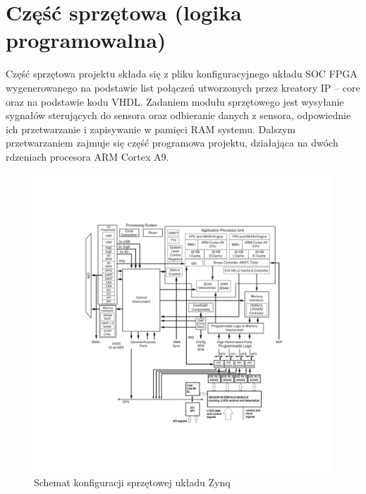\documentclass[a4paper,11pt,oneside]{book}  %
\begin{document}
\section{Część sprzętowa (logika programowalna)}
Część sprzętowa projektu składa się z pliku konfiguracyjnego układu SOC FPGA wygenerowanego na podstawie list połączeń utworzonych przez kreatory IP – core oraz na podstawie kodu VHDL. Zadaniem modułu sprzętowego jest wysyłanie sygnałów sterujących do sensora oraz odbieranie danych z sensora, odpowiednie ich przetwarzanie i zapisywanie w pamięci RAM systemu. Dalszym przetwarzaniem zajmuje się część programowa projektu, działająca na dwóch rdzeniach procesora ARM Cortex A9.

\begin{figure}[H]
	\centering
	\includegraphics[width=16cm]{fpga.png}
	\caption{Schemat konfiguracji sprzętowej układu Zynq}
	\label{fig:Zynq}
\end{figure}
\end{document}
